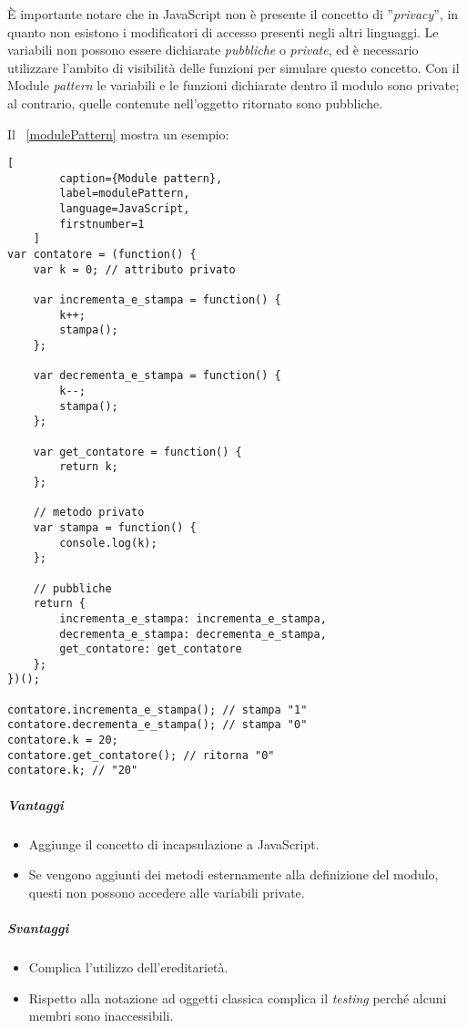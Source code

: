 È importante notare che in JavaScript non è presente il concetto di ''\textit{privacy}'', in quanto non esistono i modificatori di accesso presenti negli altri linguaggi. Le variabili non possono essere dichiarate \textit{pubbliche} o \textit{private}, ed è necessario utilizzare l'ambito di visibilità delle funzioni per simulare questo concetto. Con il Module \textit{pattern} le variabili e le funzioni dichiarate dentro il modulo sono private; al contrario, quelle contenute nell'oggetto ritornato sono pubbliche. 

Il \lstlistingname~\ref{modulePattern} mostra un esempio:
\begin{lstlisting}[
		caption={Module pattern},
		label=modulePattern,
		language=JavaScript,
		firstnumber=1
	]
var contatore = (function() {
	var k = 0; // attributo privato
	
	var incrementa_e_stampa = function() {
		k++;
		stampa();
	};
	
	var decrementa_e_stampa = function() {
		k--;
		stampa();
	};
	
	var get_contatore = function() {
		return k;
	};
	
	// metodo privato
	var stampa = function() {
		console.log(k);
	};
	
	// pubbliche
	return {
		incrementa_e_stampa: incrementa_e_stampa,
		decrementa_e_stampa: decrementa_e_stampa,
		get_contatore: get_contatore
	};
})();

contatore.incrementa_e_stampa(); // stampa "1"
contatore.decrementa_e_stampa(); // stampa "0"
contatore.k = 20;
contatore.get_contatore(); // ritorna "0"
contatore.k; // "20"
\end{lstlisting}

\newpage
\subparagraph{Vantaggi}
\begin{itemize}
\item Aggiunge il concetto di incapsulazione a JavaScript.
\item Se vengono aggiunti dei metodi esternamente alla definizione del modulo, questi non possono accedere alle variabili private.
\end{itemize}

\subparagraph{Svantaggi}
\begin{itemize}
\item Complica l'utilizzo dell'ereditarietà.
\item Rispetto alla notazione ad oggetti classica complica il \textit{testing} perché alcuni membri sono inaccessibili.
\end{itemize}

